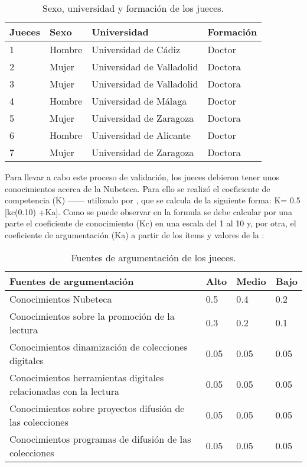 \documentclass[spanish]{textolivre}
\begin{document}
\begin{table}[htbp]
\centering
\begin{threeparttable}
\caption{Sexo, universidad y formación de los jueces.}
\label{tbl2}
\centering
\begin{tabular}{llll}
\toprule
Jueces & Sexo & Universidad & Formación \\ \midrule
1 & Hombre & Universidad de Cádiz & Doctor \\
2 & Mujer & Universidad de Valladolid & Doctora \\
3 & Mujer & Universidad de Valladolid & Doctora \\
4 & Hombre & Universidad de Málaga & Doctor \\
5 & Mujer & Universidad de Zaragoza & Doctora \\
6 & Hombre & Universidad de Alicante & Doctor \\
7 & Mujer & Universidad de Zaragoza & Doctora \\
\bottomrule
\end{tabular}
\end{threeparttable}
\end{table}

Para llevar a cabo este proceso de validación, los jueces debieron tener unos conocimientos acerca de la Nubeteca. Para ello se realizó el coeficiente de competencia (K) —— utilizado por \textcite{almenara_utilizacion_2013}, que se calcula de la siguiente forma: K= 0.5 [kc(0.10) +Ka]. Como se puede observar en la formula se debe calcular por una parte  el coeficiente de conocimiento (Kc) en una escala del 1 al 10 y, por otra, el coeficiente de argumentación (Ka) a partir de los ítems y valores de la :


\begin{table}[htbp]
\centering
\begin{threeparttable}
\caption{Fuentes de argumentación de los jueces.}
\label{tbl3}
\centering
\begin{tabular}{llll}
\toprule
Fuentes de argumentación & Alto & Medio & Bajo \\ 
\midrule
Conocimientos Nubeteca & 0.5 & 0.4 & 0.2  \\
Conocimientos sobre la  promoción de la lectura & 0.3 & 0.2 & 0.1 \\
Conocimientos dinamización de colecciones digitales & 0.05 & 0.05 & 0.05 \\
Conocimientos herramientas digitales relacionadas con la lectura & 0.05 & 0.05 & 0.05 \\
Conocimientos sobre proyectos difusión de las colecciones & 0.05 & 0.05 & 0.05 \\
Conocimientos programas de difusión de las colecciones & 0.05 & 0.05 & 0.05 \\
\bottomrule
\end{tabular}
\end{threeparttable}
\end{table}
\end{document}

